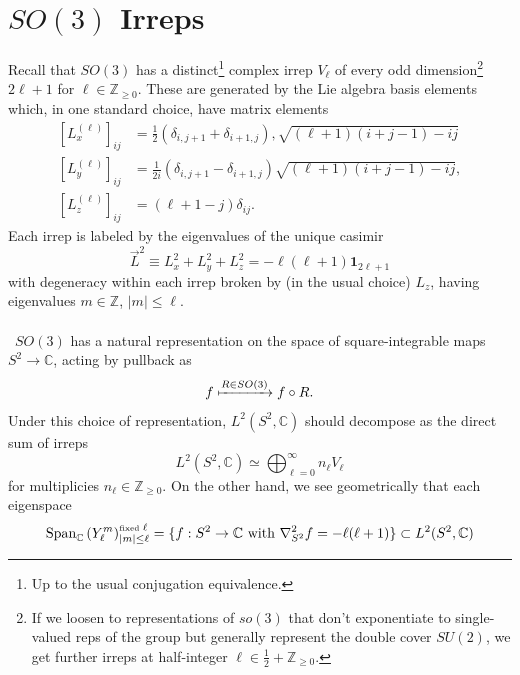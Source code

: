 \documentclass[11pt,letterpaper]{article}
\newcommand{\LP}{\left(}
\newcommand{\RP}{\right)}
\newcommand{\C}{\mathbb{C}}
\newcommand{\Z}{\mathbb{Z}}
\begin{document}
\section{$SO(3)$ Irreps}
Recall that $SO(3)$ has a distinct\footnote{Up to the usual conjugation equivalence.} complex irrep $V_\ell$ of every odd dimension\footnote{If we loosen to representations of $so(3)$ that don't exponentiate to single-valued reps of the group but generally represent the double cover $SU(2)$, we get further irreps at half-integer $\ell \in \frac{1}{2} + \Z_{\geq 0}$.} $2 \ell + 1$ for $\ell \in \Z_{\geq 0}$. These are generated by the Lie algebra basis elements which, in one standard choice, have matrix elements \begin{equation}
\begin{aligned}
[L^{(\ell)}_x]_{ij} & = \frac{1}{2} (\delta_{i, j+1} + \delta_{i+1,j}), \sqrt{(\ell + 1) (i + j - 1) - ij} \\
[L^{(\ell)}_y]_{ij} & = \frac{1}{2i} (\delta_{i, j + 1} - \delta_{i + 1, j}) \sqrt{(\ell + 1)( i + j - 1) -ij }, \\
[L^{(\ell)}_z]_{ij} & = (\ell + 1 - j) \delta_{ij}.
\end{aligned}
\end{equation}
Each irrep is labeled by the eigenvalues of the unique casimir \begin{equation}
\vec{L}^2 \equiv L_x^2 + L_y^2 + L_z^2 = - \ell(\ell + 1) \mathbf{1}_{2 \ell + 1}
\end{equation}
with degeneracy within each irrep broken by (in the usual choice) $L_z$, having eigenvalues $m \in \Z$, $|m| \leq \ell$.\\
\\
\
$SO(3)$ has a natural representation on the space of square-integrable maps $S^2 \to \C$, acting by pullback as \begin{equation}
f \xmapsto{R \in SO(3)} f \circ R.
\end{equation}
Under this choice of representation, $L^2(S^2, \C)$ should decompose as the direct sum of irreps \begin{equation}
L^2(S^2, \C) \simeq \bigoplus_{\ell = 0}^\infty n_\ell V_\ell
\end{equation}
for multiplicies $n_\ell \in \Z_{\geq 0}$. On the other hand, we see geometrically that each eigenspace \begin{equation}
\mbox{Span}_\C \LP Y_\ell^m \RP_{|m| \leq \ell}^{\mbox{\tiny{fixed }} \ell} = \{ f: S^2 \to \C \mbox{ with } \nabla^2_{S^2} f = - \ell (\ell + 1) \} \subset L^2(S^2, \C)
\end{equation}
\end{document}
